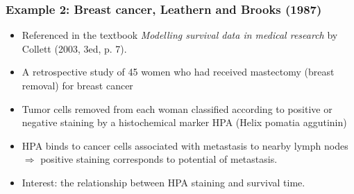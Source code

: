 \documentclass{beamer}
\newcounter{example}
\newenvironment{wideitemize}%
  {\begin{itemize}%
    \setlength{\parskip}{1em}}%
  {\end{itemize}}
\newcommand{\examp}{\refstepcounter{example}
       { \textbf{Example 8.\arabic{example}.}\ }}
\begin{document}
\begin{frame} \frametitle{Example 2: Breast cancer, Leathern and Brooks (1987)}
%
 
 \begin{wideitemize}
 
 \item Referenced in the textbook \emph{Modelling survival data in medical research} by Collett (2003, 3ed, p. 7). 
 
 \item A retrospective study of 45 women who had received mastectomy (breast removal) for breast cancer
 
 \item Tumor cells removed from each woman classified according to positive or negative staining by a histochemical marker HPA (Helix pomatia aggutinin)
 
 \item HPA binds to cancer cells associated with metastasis to nearby lymph nodes $\Rightarrow$ positive staining corresponds to potential of metastasis. 
 
 \item Interest: the relationship between HPA staining and survival time. 
 \end{wideitemize}
 

\end{frame}
\end{document}
